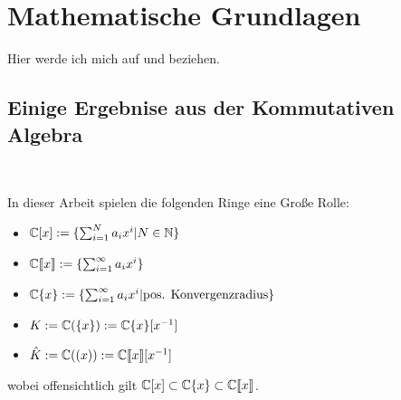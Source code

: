 \chapter{Mathematische Grundlagen}

Hier werde ich mich auf \cite{sabbah_cimpa90} und \cite{coutinho1995primer} beziehen.

\section{Einige Ergebnise aus der Kommutativen Algebra}~

In dieser Arbeit spielen die folgenden Ringe eine Große Rolle:
\begin{itemize}
  \item ${\mathbb C}[x]:=\{ \sum^{N}_{i=1}a_ix^i | N\in {\mathbb N} \}$
  \item ${\mathbb C}\llbracket x\rrbracket:=\{ \sum^{\infty}_{i=1}a_ix^i \}$
  \item ${\mathbb C}\{x\}:=\{ \sum^{\infty}_{i=1}a_ix^i | \mbox{pos.
        Konvergenzradius} \}$
  \item $K:={\mathbb C}(\{x\}):={\mathbb C}\{x\}[x^{-1}]$
  \item $\hat{K}:={\mathbb C}((x)):={\mathbb C}\llbracket x\rrbracket[x^{-1}]$
\end{itemize}

wobei offensichtlich gilt ${\mathbb C}[x]\subset{\mathbb C}\{x\}\subset{\mathbb C}\llbracket x\rrbracket$.

\begin{comment}
  \begin{lem}[Seite 2]
    ein paar eigenschaften
    \begin{enumerate}
      \item $\C[x]$ ist ein graduierter Ring, durch die Grad der
        Polynome. Diese graduierung induziert eine aufsteigende Filtrierung.

        alle Ideale haben die form $(x-a)$ mit $,a\in \C$
      \item wenn $\mathfrak{m}$ das maximale Ideal von $\C[x]$ (erzeugt von
        $x$ ist), so ist
        \[
          \C[[x]]=
          \underset{k}{\underleftarrow{\lim}} \C[X]\backslash\mathfrak{m}^k
        \]
        The ring $\C[[x]]$ ist ein nöterscher lokaler Ring:
        jede Potenzreihe mit konstantem term $\neq 0$ ist invertierbar.

        Der ring ist ebenfalls ein diskreter ??? Ring (discrete valuation
        ring)

        Die Filtrierung nach grad des Maximalen Ideals, genannt
        $\mathfrak{m}$-adische Fitration, ist die Filtrierung
        $\mathfrak{m}^k=\{f\in \C[[x]]|v(f)\geq k\}$

        und es gilt $gr_\mathfrak{m}(\C[[x]])=\C[x]$
      \item $\C\{x\}\subset \C[[x]]$ ist ein Untering der Potenzreihen, wobei
        der Konvergenzradius echt positiv ist.

        ist ähnlich zu $\C[[x]]$
    \end{enumerate}
  \end{lem}
\end{comment}

